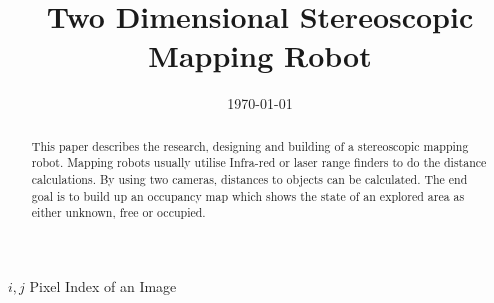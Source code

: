 \documentclass{ecsreport}      %
\newcommand{\inote}[1] {\todo[inline]{#1}}
\begin{document}
\frontmatter
\title      {Two Dimensional Stereoscopic Mapping Robot}
\addresses  {\groupname\\\deptname\\\univname}
\date       {\today}
\subject    {}
\keywords   {}
\maketitle
\inote{Turn off iNotes!}
\begin{abstract}
This paper describes the research, designing and building of a stereoscopic mapping robot. Mapping robots usually utilise Infra-red or laser range finders to do the distance calculations. By using two cameras, distances to objects can be calculated. The end goal is to build up an occupancy map which shows the state of an explored area as either unknown, free or occupied. 
\end{abstract}
\tableofcontents
\listoffigures
\listoftables
\lstlistoflistings
{}
			$i,j$	Pixel Index of an Image
			
\mainmatter






\appendix


\backmatter


\end{document}
